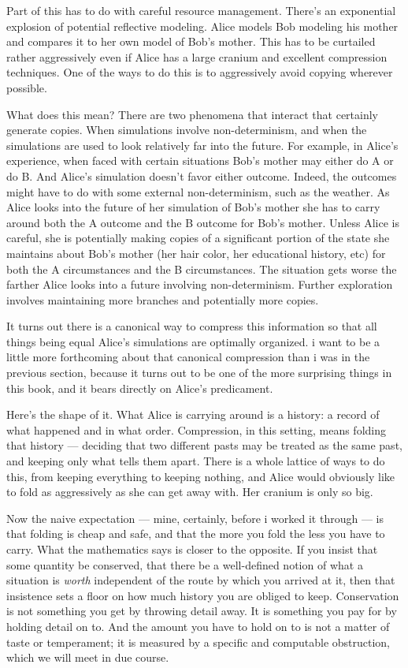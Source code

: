 Part of this has to do with careful resource management. There's an exponential explosion of potential reflective modeling. Alice models Bob modeling his mother and compares it to her own model of Bob's mother. This has to be curtailed rather aggressively even if Alice has a large cranium and excellent compression techniques. One of the ways to do this is to aggressively avoid copying wherever possible.

What does this mean? There are two phenomena that interact that certainly generate copies. When simulations involve non-determinism, and when the simulations are used to look relatively far into the future. For example, in Alice's experience, when faced with certain situations Bob's mother may either do A or do B. And Alice's simulation doesn't favor either outcome. Indeed, the outcomes might have to do with some external non-determinism, such as the weather. As Alice looks into the future of her simulation of Bob's mother she has to carry around both the A outcome and the B outcome for Bob's mother. Unless Alice is careful, she is potentially making copies of a significant portion of the state she maintains about Bob's mother (her hair color, her educational history, etc) for both the A circumstances and the B circumstances. The situation gets worse the farther Alice looks into a future involving non-determinism. Further exploration involves maintaining more branches and potentially more copies.

It turns out there is a canonical way to compress this information so that all things being equal Alice's simulations are optimally organized. i want to be a little more forthcoming about that canonical compression than i was in the previous section, because it turns out to be one of the more surprising things in this book, and it bears directly on Alice's predicament.

Here's the shape of it. What Alice is carrying around is a history: a record of what happened and in what order. Compression, in this setting, means folding that history --- deciding that two different pasts may be treated as the same past, and keeping only what tells them apart. There is a whole lattice of ways to do this, from keeping everything to keeping nothing, and Alice would obviously like to fold as aggressively as she can get away with. Her cranium is only so big.

Now the naive expectation --- mine, certainly, before i worked it through --- is that folding is cheap and safe, and that the more you fold the less you have to carry. What the mathematics says is closer to the opposite. If you insist that some quantity be conserved, that there be a well-defined notion of what a situation is \emph{worth} independent of the route by which you arrived at it, then that insistence sets a floor on how much history you are obliged to keep. Conservation is not something you get by throwing detail away. It is something you pay for by holding detail on to. And the amount you have to hold on to is not a matter of taste or temperament; it is measured by a specific and computable obstruction, which we will meet in due course.

